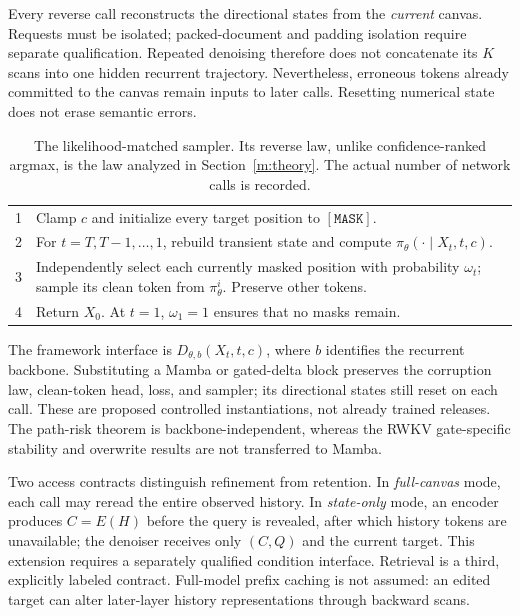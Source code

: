 \documentclass{article}
\theoremstyle{remark}\newtheorem{remark}[theorem]{Remark}
\newcommand{\mask}{\mathtt{[MASK]}}
\begin{document}
Every reverse call reconstructs the directional states from the \emph{current} canvas. Requests must be isolated; packed-document and padding isolation require separate qualification. Repeated denoising therefore does not concatenate its $K$ scans into one hidden recurrent trajectory. Nevertheless, erroneous tokens already committed to the canvas remain inputs to later calls. Resetting numerical state does not erase semantic errors.

\begin{table}[t]
\centering\small
\caption{The likelihood-matched sampler. Its reverse law, unlike confidence-ranked argmax, is the law analyzed in Section~\ref{m:theory}. The actual number of network calls is recorded.}
\begin{tabularx}{\linewidth}{@{}rY@{}}
 & Clamp $c$ and initialize every target position to $\mask$.\\
2 & For $t=T,T-1,\ldots,1$, rebuild transient state and compute $\pi_\theta(\cdot\mid X_t,t,c)$.\\
3 & Independently select each currently masked position with probability $\omega_t$; sample its clean token from $\pi_\theta^i$. Preserve other tokens.\\
4 & Return $X_0$. At $t=1$, $\omega_1=1$ ensures that no masks remain.\\
\bottomrule
\end{tabularx}
\label{m:algorithm}
\end{table}

The framework interface is $D_{\theta,b}(X_t,t,c)$, where $b$ identifies the recurrent backbone. Substituting a Mamba or gated-delta block preserves the corruption law, clean-token head, loss, and sampler; its directional states still reset on each call. These are proposed controlled instantiations, not already trained releases. The path-risk theorem is backbone-independent, whereas the RWKV gate-specific stability and overwrite results are not transferred to Mamba.

Two access contracts distinguish refinement from retention. In \emph{full-canvas} mode, each call may reread the entire observed history. In \emph{state-only} mode, an encoder produces $C=E(H)$ before the query is revealed, after which history tokens are unavailable; the denoiser receives only $(C,Q)$ and the current target. This extension requires a separately qualified condition interface. Retrieval is a third, explicitly labeled contract. Full-model prefix caching is not assumed: an edited target can alter later-layer history representations through backward scans.
\end{document}

